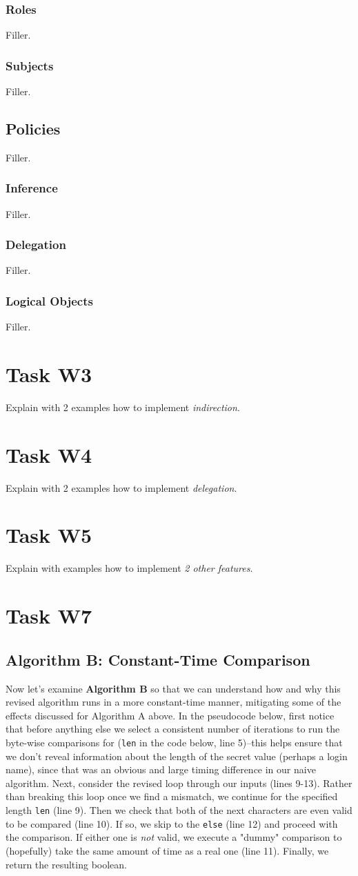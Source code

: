 \documentclass{article}
\providecommand{\task}[1]{\section{Task #1}}
\providecommand{\inlinecode}{\texttt}
\begin{document}
\subsubsection{Roles}
Filler.

\subsubsection{Subjects}
Filler.


\subsection{Policies}
Filler.
\subsubsection{Inference}
Filler.
\subsubsection{Delegation}
Filler.
\subsubsection{Logical Objects}
Filler.



\task{W3}
Explain with 2 examples how to implement \textit{indirection}.

\task{W4}
Explain with 2 examples how to implement \textit{delegation}.


\task{W5}
Explain with examples how to implement \textit{2 other features}.


\pagebreak

\section{Task W7}
\subsection{Algorithm B: Constant-Time Comparison}
Now let's examine \textbf{Algorithm B} so that we can understand how and why this revised algorithm runs in a more constant-time manner, mitigating some of the effects discussed for Algorithm A above.
In the pseudocode below, first notice that before anything else we select a consistent number of iterations to run the byte-wise comparisons for (\inlinecode{len} in the code below, line 5)--this helps ensure that we don't reveal information about the length of the secret value (perhaps a login name), since that was an obvious and large timing difference in our naive algorithm.
Next, consider the revised loop through our inputs (lines 9-13). Rather than breaking this loop once we find a mismatch, we continue for the specified length \inlinecode{len} (line 9).
Then we check that both of the next characters are even valid to be compared (line 10). If so, we skip to the \inlinecode{else} (line 12) and proceed with the comparison. If either one is \textit{not} valid, we execute a "dummy" comparison to (hopefully) take the same amount of time as a real one (line 11).
Finally, we return the resulting boolean.
\end{document}

